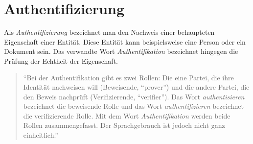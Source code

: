 \documentclass[11pt,a4paper,ngerman]{scrreprt}
\begin{document}
\section{Authentifizierung}\label{sec:Authentifizierung}
Als \emph{Authentifizierung} bezeichnet man den Nachweis einer behaupteten Eigenschaft einer Entität. Diese Entität kann beispielsweise eine Person oder ein Dokument sein. Das verwandte Wort \emph{Authentifikation} bezeichnet hingegen die Prüfung der Echtheit der Eigenschaft.
\begin{quote}
    ``Bei der Authentifikation gibt es zwei Rollen: Die eine Partei, die ihre Identität nachweisen will (Beweisende, ``prover'') und die andere Partei, die den Beweis nachprüft (Verifizierende, ``verifier''). Das Wort \emph{authentisieren} bezeichnet die beweisende Rolle und das Wort \emph{authentifizieren} bezeichnet die verifizierende Rolle. Mit dem Wort \emph{Authentifikation} werden beide Rollen zusammengefasst. Der Sprachgebrauch ist jedoch nicht ganz einheitlich.'' \cite[S. 149]{kryptSec11}
\end{quote}
\end{document}
